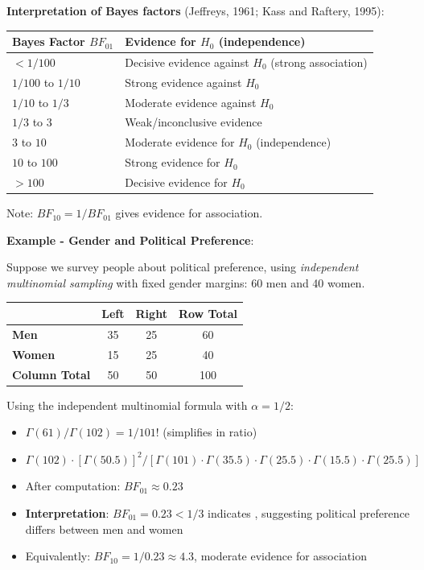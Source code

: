 \textbf{Interpretation of Bayes factors} (Jeffreys, 1961; Kass and Raftery, 1995):
\begin{center}
\begin{tabular}{|l|l|}
    \hline
    \textbf{Bayes Factor $BF_{01}$} & \textbf{Evidence for $H_0$ (independence)} \\
    \hline
    $< 1/100$ & Decisive evidence against $H_0$ (strong association) \\
    $1/100$ to $1/10$ & Strong evidence against $H_0$ \\
    $1/10$ to $1/3$ & Moderate evidence against $H_0$ \\
    $1/3$ to $3$ & Weak/inconclusive evidence \\
    $3$ to $10$ & Moderate evidence for $H_0$ (independence) \\
    $10$ to $100$ & Strong evidence for $H_0$ \\
    $> 100$ & Decisive evidence for $H_0$ \\
    \hline
\end{tabular}
\end{center}

Note: $BF_{10} = 1/BF_{01}$ gives evidence for association.

\textbf{Example - Gender and Political Preference}:

Suppose we survey people about political preference, using \emph{independent multinomial
sampling} with fixed gender margins: 60 men and 40 women.

\begin{center}
\begin{tabular}{|l|c|c|c|}
    \hline
    & \textbf{Left} & \textbf{Right} & \textbf{Row Total} \\
    \hline
    \textbf{Men} & 35 & 25 & 60 \\
    \textbf{Women} & 15 & 25 & 40 \\
    \hline
    \textbf{Column Total} & 50 & 50 & 100 \\
    \hline
\end{tabular}
\end{center}

Using the independent multinomial formula with $\alpha = 1/2$:
\begin{itemize}
    \item $\Gamma(61)/\Gamma(102) = 1/101!$ (simplifies in ratio)
    \item $\Gamma(102) \cdot [\Gamma(50.5)]^2 / [\Gamma(101) \cdot \Gamma(35.5) \cdot \Gamma(25.5) \cdot \Gamma(15.5) \cdot \Gamma(25.5)]$
    \item After computation: $BF_{01} \approx 0.23$
    \item \textbf{Interpretation}: $BF_{01} = 0.23 < 1/3$ indicates ,
        suggesting political preference differs between men and women
    \item Equivalently: $BF_{10} = 1/0.23 \approx 4.3$, moderate evidence for association
\end{itemize}

